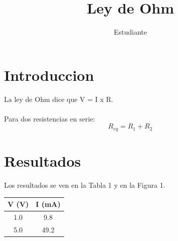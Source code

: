 \documentclass[12pt]{article}
\title{Ley de Ohm}
\author{Estudiante}
\begin{document}
\maketitle
\tableofcontents

\section{Introduccion}
La ley de Ohm dice que V = I x R.\\
\\
Para dos resistencias en serie: $$R_{eq} = R_1 + R_2$$

\section{Resultados}
Los resultados se ven en la Tabla 1 y en la Figura 1.

\begin{table}[h]
\begin{tabular}{|c|c|}
\hline
V (V) & I (mA) \\
\hline
1.0 & 9.8 \\
5.0 & 49.2 \\
\hline
\end{tabular}
\end{table}

\end{document}
